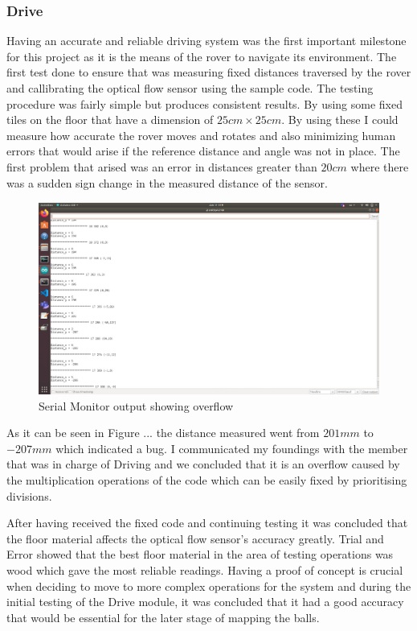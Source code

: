 \documentclass[a4paper]{article}
\begin{document}
\subsubsection{Drive}
Having an accurate and reliable driving system was the first important milestone for this project as it is the means of the rover to navigate its environment.
The first test done to ensure that was measuring fixed distances traversed by the rover and callibrating the optical flow sensor using the sample code. The testing procedure was fairly simple but produces consistent results.
By using some fixed tiles on the floor that have a dimension of \(25cm\times 25cm\). By using these I could measure how accurate the rover moves and rotates and also minimizing human errors that would arise if the reference distance and angle was not in place. 
The first problem that arised was an error in distances greater than \(20cm\) where there was a sudden sign change  in the measured distance of the sensor.
\begin{figure}
    \centering
    \includegraphics[scale=0.5]{./images/overflow_example.png}
    \caption{Serial Monitor output showing overflow}
    \label{fig:Overflow of Distance}
 \end{figure}
As it can be seen in Figure ... the distance measured went from \(201mm\) to \(-207mm\) which indicated a bug. I communicated my foundings with the member that 
was in charge of Driving and we concluded that it is an overflow caused by the multiplication operations of the code which can be easily fixed by prioritising divisions.

After having received the fixed code and continuing testing it was concluded that the floor material affects the optical flow sensor's accuracy greatly. Trial and Error showed that the best floor material in the area of testing operations was wood which gave the most reliable readings.
Having a proof of concept is crucial when deciding to move to more complex operations for the system and during the initial testing of the Drive module, it was concluded that it had a good accuracy that would be essential for the later stage of mapping the balls.
\end{document}
